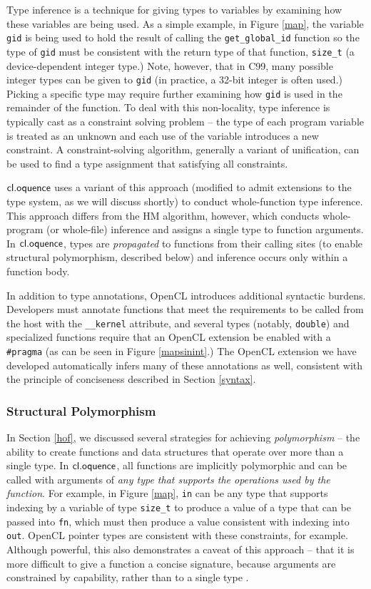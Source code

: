 \documentclass[10pt, conference, compsocconf]{IEEEtran}
\begin{document}
Type inference is a technique for giving types to variables by examining how these variables are being used. As a simple example, in Figure \ref{map}, the variable \verb|gid| is being used to hold the result of calling the \verb|get_global_id| function so the type of \verb|gid| must be consistent with the return type of that function, \verb|size_t| (a device-dependent integer type.) Note, however, that in C99, many possible integer types can be given to \verb|gid| (in practice, a 32-bit integer is often used.) Picking a specific type may require further examining how \verb|gid| is used in the remainder of the function. 
To deal with this non-locality, type inference is typically cast as a constraint solving problem -- the type of each program variable is treated as an unknown and each use of the variable introduces a new constraint. A constraint-solving algorithm, generally a variant of unification, can be used to find a type assignment that satisfying all constraints.

$\textsf{cl.oquence}$ uses a variant of this approach (modified to admit extensions to the type system, as we will discuss shortly) to conduct whole-function type inference. This approach differs from the HM algorithm, however, which conducts whole-program (or whole-file) inference and assigns a single type to function arguments. In $\textsf{cl.oquence}$, types are {\it propagated} to functions from their calling sites (to enable structural polymorphism, described below) and inference occurs only within a function body.

In addition to type annotations, OpenCL introduces additional syntactic burdens. Developers must annotate functions that meet the requirements to be called from the host with the \verb|__kernel| attribute, and several types (notably, \verb|double|) and specialized functions require that an OpenCL extension be enabled with a \verb|#pragma| (as  can be seen in Figure \ref{mapsinint}.) The OpenCL extension we have developed automatically infers many of these annotations as well, consistent with the principle of conciseness described in Section \ref{syntax}.

\subsubsection{Structural Polymorphism}
In Section \ref{hof}, we discussed several strategies for achieving {\it polymorphism} -- the ability to create functions and data structures that operate over more than a single type. In $\textsf{cl.oquence}$, all functions are implicitly polymorphic and can be called with arguments of {\it any type that supports the operations used by the function}. For example, in Figure \ref{map}, \verb|in| can be any type that supports indexing by a variable of type \verb|size_t| to produce a value of a type that can be passed into \verb|fn|, which must then produce a value consistent with indexing into \verb|out|. OpenCL pointer types are consistent with these constraints, for example. Although powerful, this also demonstrates a caveat of this approach -- that it is more difficult to give a function a concise signature, because arguments are constrained by capability, rather than to a single type \cite{malayeri2009structural}.
\end{document}
